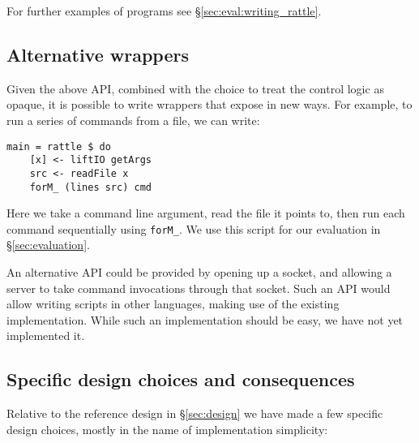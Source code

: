 For further examples of \Rattle programs see \S\ref{sec:eval:writing_rattle}.

\subsection{Alternative \Rattle wrappers}

Given the above API, combined with the choice to treat the control logic as opaque, it is possible to write wrappers that expose \Rattle in new ways. For example, to run a series of commands from a file, we can write:

\vspace{3mm}
\begin{small}
\begin{verbatim}
main = rattle $ do
    [x] <- liftIO getArgs
    src <- readFile x
    forM_ (lines src) cmd
\end{verbatim}
\end{small}
\vspace{3mm}

Here we take a command line argument, read the file it points to, then run each command sequentially using \texttt{forM\_}. We use this script for our evaluation in \S\ref{sec:evaluation}.

An alternative API could be provided by opening up a socket, and allowing a \Rattle server to take command invocations through that socket. Such an API would allow writing \Rattle scripts in other languages, making use of the existing \Rattle implementation. While such an implementation should be easy, we have not yet implemented it.

\subsection{Specific design choices and consequences}
\label{sec:choices}

Relative to the reference design in \S\ref{sec:design} we have made a few specific design choices, mostly in the name of implementation simplicity:

